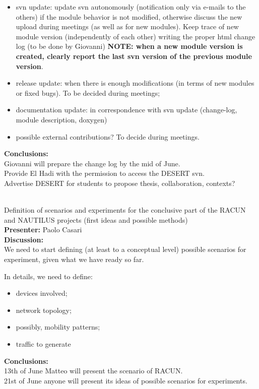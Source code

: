 \documentclass[11pt,journal,draftclsnofoot,onecolumn,twoside,letterpaper]{IEEEtran}
\theoremstyle{definition} \newtheorem{definition}[]{Definition}
\theoremstyle{theorem} \newtheorem{theorem}[]{Theorem}
\begin{document}
\begin{itemize}
  \item svn update: update svn autonomously (notification only via e-mails to the others) if the module behavior is not modified, otherwise discuss the new upload during meetings (as well as for new modules). Keep trace of new module version (independently of each other) writing the proper html change log (to be done by Giovanni) {\bf NOTE: when a new module version is created, clearly report the last svn version of the previous module version}. 
  \item release update: when there is enough modifications (in terms of new modules or fixed bugs). To be decided during meetings;
  \item documentation update: in correspondence with svn update (change-log, module description, doxygen)
  \item possible external contributions? To decide during meetings.
\end{itemize}

{\bf Conclusions:}\\
Giovanni will prepare the change log by the mid of June.\\
Provide El Hadi with the permission to access the DESERT svn.\\
Advertise DESERT for students to propose thesis, collaboration, contexts? 

\  \\
 Definition of scenarios and experiments for the conclusive part of the RACUN and NAUTILUS projects  (first ideas and possible methods)\\
{\bf Presenter:} Paolo Casari\\
{\bf Discussion:} \\

We need to start defining (at least to a conceptual level) possible scenarios for experiment, given what we have ready so far.

In details, we need to define:
\begin{itemize}
 \item devices involved;
 \item network topology;
 \item possibly, mobility patterns;
 \item traffic to generate
\end{itemize}

{\bf Conclusions:}\\
13th of June Matteo will present the scenario of RACUN.\\
21st of June anyone will present its ideas of possible scenarios for experiments.
\end{document}
